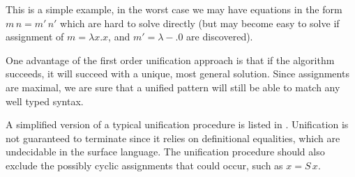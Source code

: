 This is a simple example, in the worst case we may have equations in the form $m\,n=m'\,n'$ which are hard to solve directly (but may become easy to solve if assignment of $m=\lambda x.x$, and $m'=\lambda-.0$ are discovered).

One advantage of the first order unification approach is that if the algorithm succeeds, it will succeed with a unique, most general solution.
Since assignments are maximal, we are sure that a unified pattern will still be able to match any well typed syntax.

A simplified version of a typical unification procedure is listed in .
Unification is not guaranteed to terminate since it relies on definitional equalities, which are undecidable in the surface language.
The unification procedure should also exclude the possibly cyclic assignments that could occur, such as $x=S\,x$.

